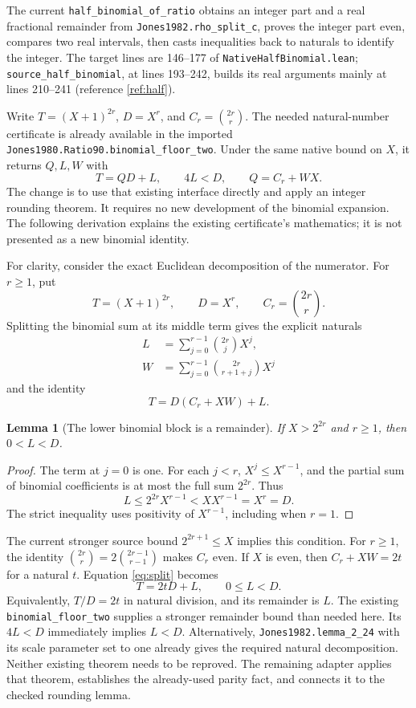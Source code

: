 \documentclass[11pt,a4paper]{article}
\newcommand{\code}[1]{\nolinkurl{#1}}
\newtheorem{lemma}[theorem]{Lemma}
\begin{document}
The current \code{half_binomial_of_ratio} obtains an integer part and a real
fractional remainder from \code{Jones1982.rho_split_c}, proves the integer
part even, compares two real intervals, then casts inequalities back to
naturals to identify the integer. The target lines are 146--177 of
\code{NativeHalfBinomial.lean}; \code{source_half_binomial}, at lines
193--242, builds its real arguments mainly at lines 210--241
(reference \ref{ref:half}).

Write \(T=(X+1)^{2r}\), \(D=X^r\), and \(C_r=\binom{2r}{r}\).
The needed natural-number certificate is already available in the imported
\code{Jones1980.Ratio90.binomial_floor_two}. Under the same native bound on \(X\),
it returns \(Q,L,W\) with
\[
 T=QD+L,\qquad 4L<D,\qquad Q=C_r+WX.
\]
The change is to use that existing interface directly and apply an integer
rounding theorem. It requires no new development of the binomial expansion.
The following derivation explains the existing certificate's mathematics;
it is not presented as a new binomial identity.

For clarity, consider the exact Euclidean decomposition of the numerator.
For \(r\ge1\), put
\[
 T=(X+1)^{2r},\qquad D=X^r,\qquad C_r=\binom{2r}{r}.
\]
Splitting the binomial sum at its middle term gives the explicit naturals
\begin{align*}
 L&=\sum_{j=0}^{r-1}\binom{2r}{j}X^j,\\
 W&=\sum_{j=0}^{r-1}\binom{2r}{r+1+j}X^j
\end{align*}
and the identity
\begin{equation}
 T=D(C_r+XW)+L.
 \label{eq:split}
\end{equation}

\begin{lemma}[The lower binomial block is a remainder]
If \(X>2^{2r}\) and \(r\ge1\), then \(0<L<D\).
\end{lemma}
\begin{proof}
The term at \(j=0\) is one. For each \(j<r\),
\(X^j\le X^{r-1}\), and the partial sum of binomial coefficients is at most
the full sum \(2^{2r}\). Thus
\[
 L\le2^{2r}X^{r-1}<XX^{r-1}=X^r=D.
\]
The strict inequality uses positivity of \(X^{r-1}\), including when \(r=1\).
\end{proof}

The current stronger source bound \(2^{2r+1}\le X\) implies this condition.
For \(r\ge1\), the identity
\(\binom{2r}{r}=2\binom{2r-1}{r-1}\) makes \(C_r\) even. If \(X\) is even,
then \(C_r+XW=2t\) for a natural \(t\). Equation \eqref{eq:split} becomes
\begin{equation}
 \boxed{T=2tD+L,\qquad 0\le L<D.}
 \label{eq:half-quotient}
\end{equation}
Equivalently, \(T/D=2t\) in natural division, and its remainder is \(L\).
The existing \code{binomial_floor_two} supplies a stronger remainder bound
than needed here. Its \(4L<D\) immediately implies \(L<D\).
Alternatively, \code{Jones1982.lemma_2_24} with its scale parameter set to one
already gives the required natural decomposition. Neither existing theorem
needs to be reproved. The remaining adapter applies that theorem, establishes
the already-used parity fact, and connects it to the checked rounding lemma.
\end{document}
